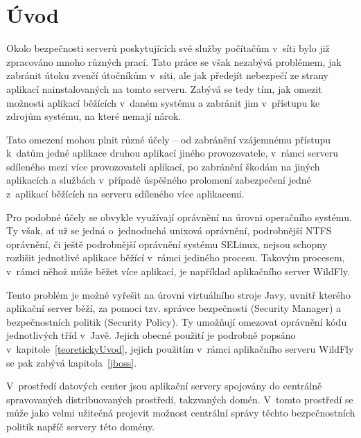 
\chapter{Úvod} \label{uplnyUvod}

Okolo bezpečnosti serverů poskytujících své služby počítačům v~síti bylo již zpracováno mnoho různých prací.
Tato práce se však nezabývá problémem, jak zabránit útoku zvenčí útočníkům v~síti, ale jak předejít nebezpečí ze strany aplikací nainstalovaných na tomto serveru.
Zabývá se tedy tím, jak omezit možnosti aplikací běžících v~daném systému a zabránit jim v~přístupu ke zdrojům systému, na které nemají nárok.

Tato omezení mohou plnit různé účely -- od zabránění vzájemnému přístupu k~datům jedné aplikace druhou aplikací jiného provozovatele,
v~rámci serveru sdíleného mezi více provozovateli aplikací, po zabránění škodám na jiných aplikacích a službách v~případě úspěšného prolomení
zabezpečení jedné z~aplikací běžících na serveru sdíleného více aplikacemi.

Pro podobné účely se obvykle využívají oprávnění na úrovni operačního systému.
Ty však, ať už se jedná o~jednoduchá unixová oprávnění, podrobnější NTFS oprávnění, či ještě podrobnější oprávnění systému SELinux,
nejsou schopny rozlišit jednotlivé aplikace běžící v~rámci jediného procesu.
Takovým procesem, v~rámci něhož může běžet více aplikací, je například aplikačního server WildFly.

Tento problém je možné vyřešit na úrovni virtuálního stroje Javy, uvnitř kterého aplikační server běží, za pomoci tzv. správce bezpečnosti (Security Manager)
a bezpečnostních politik (Security Policy). Ty umožňují omezovat oprávnění kódu jednotlivých tříd v~Javě.
Jejich obecné použití je podrobně popsáno v~kapitole~\ref{teoretickyUvod}, jejich použitím v~rámci aplikačního serveru WildFly se pak zabývá kapitola~\ref{jboss}.

V~prostředí datových center jsou aplikační servery spojovány do centrálně spravovaných distribuovaných prostředí, takzvaných domén.
V~tomto prostředí se může jako velmi užitečná projevit možnost centrální správy těchto bezpečnostních politik napříč servery této domény.

